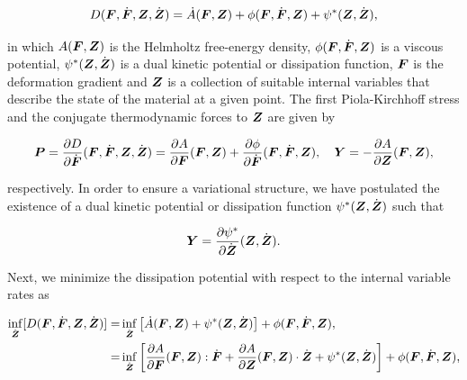 \documentclass[12pt]{article}
\numberwithin{equation}{section}
\begin{document}
\begin{equation} \label{eq:power-density}
  D({\boldsymbol{F}}, \dot{{\boldsymbol{F}}}, {\boldsymbol{Z}}, \dot{{\boldsymbol{Z}}})
  =
  \dot{A}({\boldsymbol{F}}, {\boldsymbol{Z}})
  +
  \phi({\boldsymbol{F}}, \dot{{\boldsymbol{F}}}, {\boldsymbol{Z}})
  +
  \psi^*({\boldsymbol{Z}}, \dot{{\boldsymbol{Z}}}),
\end{equation}

in which $A({\boldsymbol{F}}, {\boldsymbol{Z}})$ is the Helmholtz free-energy density,
$\phi({\boldsymbol{F}}, \dot{{\boldsymbol{F}}}, {\boldsymbol{Z}})$ is a viscous potential, $\psi^*({\boldsymbol{Z}},
\dot{{\boldsymbol{Z}}})$ is a dual kinetic potential or dissipation function, ${\boldsymbol{F}}$
is the deformation gradient and ${\boldsymbol{Z}}$ is a collection of suitable
internal variables that describe the state of the material at a given
point. The first Piola-Kirchhoff stress and the conjugate
thermodynamic forces to ${\boldsymbol{Z}}$ are given by

\begin{equation} \label{eq:1PKstress-and-Y}
  {\boldsymbol{P}}
  =
  \frac{\partial D}{\partial \dot{{\boldsymbol{F}}}}({\boldsymbol{F}}, \dot{{\boldsymbol{F}}}, {\boldsymbol{Z}}, \dot{{\boldsymbol{Z}}})
  =
  \frac{\partial A}{\partial {\boldsymbol{F}}}({\boldsymbol{F}}, {\boldsymbol{Z}})
  +
  \frac{\partial \phi}{\partial \dot{{\boldsymbol{F}}}}({\boldsymbol{F}}, \dot{{\boldsymbol{F}}}, {\boldsymbol{Z}}),
  \quad
  {\boldsymbol{Y}} = - \frac{\partial A}{\partial {\boldsymbol{Z}}} ({\boldsymbol{F}}, {\boldsymbol{Z}}),
\end{equation}

respectively. In order to ensure a variational structure, we have
postulated the existence of a dual kinetic potential or dissipation
function $\psi^*({\boldsymbol{Z}}, \dot{{\boldsymbol{Z}}})$ such that

\begin{equation} \label{eq:dual-kinetic-potential}
  {\boldsymbol{Y}} = \frac{\partial \psi^*}{\partial \dot{{\boldsymbol{Z}}}} ({\boldsymbol{Z}}, \dot{{\boldsymbol{Z}}}).
\end{equation}

Next, we minimize the dissipation potential 
with respect to the internal variable rates as

\begin{equation}
  \begin{split}
    \inf_{\dot{{\boldsymbol{Z}}}} [ D({\boldsymbol{F}}, \dot{{\boldsymbol{F}}}, {\boldsymbol{Z}}, \dot{{\boldsymbol{Z}}}) ]
    =
    &
    \inf_{\dot{{\boldsymbol{Z}}}}
    \left[
      \dot{A}({\boldsymbol{F}}, {\boldsymbol{Z}})
      +
      \psi^*({\boldsymbol{Z}}, \dot{{\boldsymbol{Z}}})
    \right] +
    \phi({\boldsymbol{F}}, \dot{{\boldsymbol{F}}}, {\boldsymbol{Z}}),
    \\
    =
    &
    \inf_{\dot{{\boldsymbol{Z}}}}
    \left[
      \frac{\partial A}{\partial {\boldsymbol{F}}}({\boldsymbol{F}}, {\boldsymbol{Z}}) : \dot{{\boldsymbol{F}}}
      +
      \frac{\partial A}{\partial {\boldsymbol{Z}}}({\boldsymbol{F}}, {\boldsymbol{Z}}) \cdot \dot{{\boldsymbol{Z}}}
      +
      \psi^*({\boldsymbol{Z}}, \dot{{\boldsymbol{Z}}})
    \right] +
    \phi({\boldsymbol{F}}, \dot{{\boldsymbol{F}}}, {\boldsymbol{Z}}),
  \end{split}
\end{equation}
\end{document}
